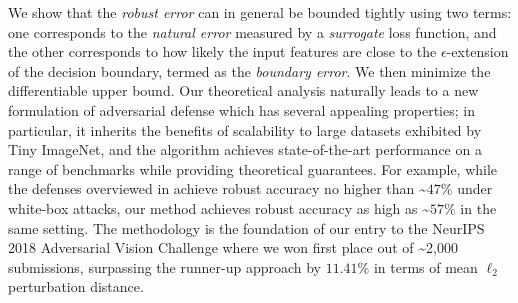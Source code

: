 \documentclass[11pt]{article}
\newcommand{\0}{\mathbf{0}}
\newcommand{\1}{\mathbf{1}}
\begin{document}
We show that the \emph{robust error} can in general be bounded tightly using two terms: one corresponds to the \emph{natural error} measured by a \emph{surrogate} loss function, and the other corresponds to how likely the input features are close to the $\epsilon$-extension of the decision boundary, termed as the \emph{boundary error}. We then minimize the differentiable upper bound. Our theoretical analysis naturally leads to a new formulation of adversarial defense which has several appealing properties; in particular, it inherits the benefits of scalability to large datasets exhibited by Tiny ImageNet, and the algorithm
achieves state-of-the-art performance on a range of benchmarks while providing theoretical guarantees. For example, while the defenses overviewed in \cite{athalye2018obfuscated} achieve robust accuracy no higher than \textasciitilde$47\%$ under white-box attacks, our method achieves robust accuracy as high as \textasciitilde$57\%$ in the same setting. The methodology is the foundation of our entry to the NeurIPS 2018 Adversarial Vision Challenge where we won first place out of \textasciitilde2,000 submissions, surpassing the runner-up approach by $11.41\%$ in terms of mean $\ell_2$ perturbation distance.
\end{document}
